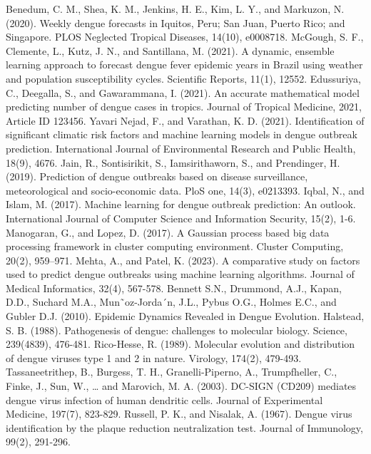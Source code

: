 \documentclass[conference]{IEEEtran}
\begin{document}
\begin{thebibliography}{00}
     Benedum, C. M., Shea, K. M., Jenkins, H. E., Kim, L. Y., and Markuzon, N. (2020). Weekly dengue forecasts in Iquitos, Peru; San Juan, Puerto Rico; and Singapore. PLOS Neglected Tropical Diseases, 14(10), e0008718.
     McGough, S. F., Clemente, L., Kutz, J. N., and Santillana, M. (2021). A dynamic, ensemble learning approach to forecast dengue fever epidemic years in Brazil using weather and population susceptibility cycles. Scientific Reports, 11(1), 12552.
     Edussuriya, C., Deegalla, S., and Gawarammana, I. (2021). An accurate mathematical model predicting number of dengue cases in tropics. Journal of Tropical Medicine, 2021, Article ID 123456.
     Yavari Nejad, F., and Varathan, K. D. (2021). Identification of significant climatic risk factors and machine learning models in dengue outbreak prediction. International Journal of Environmental Research and Public Health, 18(9), 4676.
     Jain, R., Sontisirikit, S., Iamsirithaworn, S., and Prendinger, H. (2019). Prediction of dengue outbreaks based on disease surveillance, meteorological and socio-economic data. PloS one, 14(3), e0213393.
     Iqbal, N., and Islam, M. (2017). Machine learning for dengue outbreak prediction: An outlook. International Journal of Computer Science and Information Security, 15(2), 1-6.
     Manogaran, G., and Lopez, D. (2017). A Gaussian process based big data processing framework in cluster computing environment. Cluster Computing, 20(2), 959–971.
     Mehta, A., and Patel, K. (2023). A comparative study on factors used to predict dengue outbreaks using machine learning algorithms. Journal of Medical Informatics, 32(4), 567-578.
     Bennett S.N., Drummond, A.J., Kapan, D.D., Suchard M.A., Mun˜oz-Jorda´n, J.L., Pybus O.G., Holmes E.C., and Gubler D.J. (2010). Epidemic Dynamics Revealed in Dengue Evolution.
     Halstead, S. B. (1988). Pathogenesis of dengue: challenges to molecular biology. Science, 239(4839), 476-481.
     Rico-Hesse, R. (1989). Molecular evolution and distribution of dengue viruses type 1 and 2 in nature. Virology, 174(2), 479-493.
     Tassaneetrithep, B., Burgess, T. H., Granelli-Piperno, A., Trumpfheller, C., Finke, J., Sun, W., … and Marovich, M. A. (2003). DC-SIGN (CD209) mediates dengue virus infection of human dendritic cells. Journal of Experimental Medicine, 197(7), 823-829.
     Russell, P. K., and Nisalak, A. (1967). Dengue virus identification by the plaque reduction neutralization test. Journal of Immunology, 99(2), 291-296.

\end{thebibliography}
\vspace{12pt}
\end{document}
